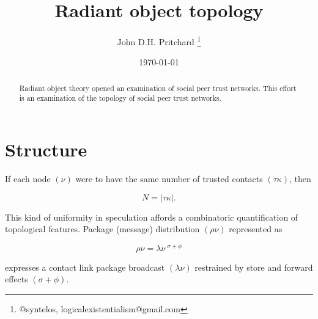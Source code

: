 \documentclass[12pt,twocolumn]{article}
\begin{document}
\title{Radiant object topology}

\author{John D.H. Pritchard \thanks{@syntelos, logicalexistentialism@gmail.com}}

\date{\today}

\maketitle


\begin{abstract}

Radiant object theory \cite{ROTI} opened an examination of social peer
trust networks.  This effort is an examination of the topology of
social peer trust networks.  
  
\end{abstract}


\section{Structure}

If each node \((\nu)\) were to have the same number of trusted
contacts \((\tau\kappa)\), then

$$
 N = | \tau\kappa | .
$$

This kind of uniformity in speculation affords a combinatoric
quantification of topological features.  Package (message)
\cite{RFC5050,RFC2045} distribution \((\rho\nu)\) represented as

$$
 \rho\nu = \lambda\nu~^{\sigma+\phi}
$$

expresses a contact link package broadcast \((\lambda\nu)\) restrained
by store and forward effects \((\sigma + \phi)\).
 
\appendix



\end{document}

